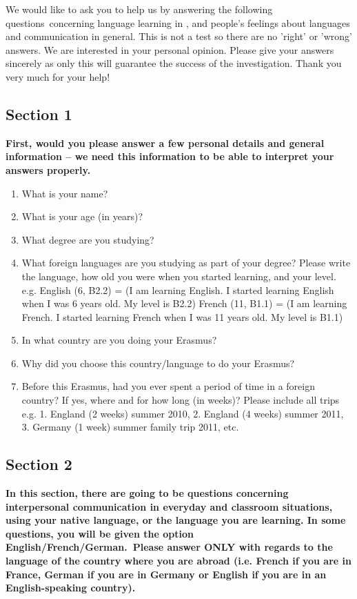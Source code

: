\documentclass[output=paper]{langsci/langscibook}
\begin{document}
We would like to ask you to help us by answering the following questions~concerning language learning in , and people's feelings about languages and communication in general. This is not a test so there are no 'right' or 'wrong' answers. We are interested in your personal opinion. Please give your answers sincerely as only this will guarantee the success of the investigation. Thank you very much for your help!~

\subsection*{Section 1} 

\textbf{First, would you please answer a few personal details and general information – we need this information to be able to interpret your answers properly.} 

\begin{enumerate}
\item 
What is your name?



\item 
What is your age (in years)?
\item 
What degree are you studying?
\item 
What foreign languages are you studying as part of your degree? Please write the language, how old you were when you started learning, and your level. e.g. {English} (6, B2.2) = (I am learning {English}. I started learning {English} when I was 6 years old. My level is B2.2) French (11, B1.1) = (I am learning French. I started learning French when I was 11 years old. My level is B1.1)
\item 
In what country are you doing your Erasmus?
\item 
Why did you choose this country/language to do your Erasmus?
\item 
Before this Erasmus, had you ever spent a period of time in a foreign country? If yes, where and for how long (in weeks)? Please include all trips e.g. 1. England (2 weeks) summer 2010, 2. England (4 weeks) summer 2011, 3. Germany (1 week) summer family trip 2011, etc.

\end{enumerate}

\subsection*{Section 2}

\textbf{In this section, there are going to be questions concerning interpersonal communication in everyday and classroom situations, using your native language, or the language you are learning. In some questions, you will be given the option {English}/French/{German}.~Please answer ONLY with regards to the language of the country where you are abroad (i.e. French if you are in France, German if you are in Germany or English if you are in an {English}-speaking country).}
\end{document}

